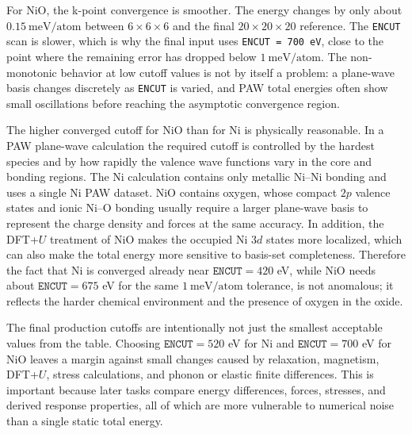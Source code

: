 For NiO, the k-point convergence is smoother.  The energy changes by only about
\(0.15~\mathrm{meV/atom}\) between \(6\times6\times6\) and the final
\(20\times20\times20\) reference.  The \texttt{ENCUT} scan is slower, which is
why the final input uses \texttt{ENCUT = 700 eV}, close to the point where the
remaining error has dropped below \(1~\mathrm{meV/atom}\).  The non-monotonic
behavior at low cutoff values is not by itself a problem: a plane-wave basis
changes discretely as \texttt{ENCUT} is varied, and PAW total energies often
show small oscillations before reaching the asymptotic convergence region.

The higher converged cutoff for NiO than for Ni is physically reasonable.  In a
PAW plane-wave calculation the required cutoff is controlled by the hardest
species and by how rapidly the valence wave functions vary in the core and
bonding regions.  The Ni calculation contains only metallic Ni--Ni bonding and
uses a single Ni PAW dataset.  NiO contains oxygen, whose compact \(2p\) valence
states and ionic Ni--O bonding usually require a larger plane-wave basis to
represent the charge density and forces at the same accuracy.  In addition, the
DFT+\(U\) treatment of NiO makes the occupied Ni \(3d\) states more localized,
which can also make the total energy more sensitive to basis-set completeness.
Therefore the fact that Ni is converged already near \(\texttt{ENCUT}=420\) eV,
while NiO needs about \(\texttt{ENCUT}=675\) eV for the same
\(1~\mathrm{meV/atom}\) tolerance, is not anomalous; it reflects the harder
chemical environment and the presence of oxygen in the oxide.

The final production cutoffs are intentionally not just the smallest acceptable
values from the table.  Choosing \(\texttt{ENCUT}=520\) eV for Ni and
\(\texttt{ENCUT}=700\) eV for NiO leaves a margin against small changes caused
by relaxation, magnetism, DFT+\(U\), stress calculations, and phonon or elastic
finite differences.  This is important because later tasks compare energy
differences, forces, stresses, and derived response properties, all of which
are more vulnerable to numerical noise than a single static total energy.
